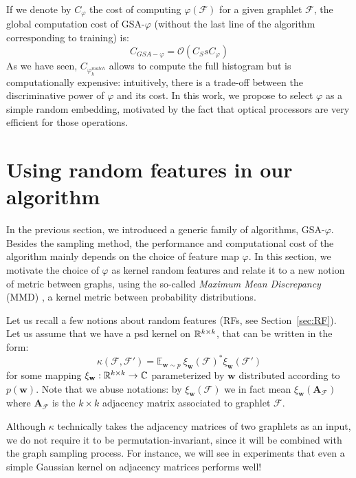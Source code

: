 If we denote by $C_\varphi$ the cost of computing $\varphi(\mathcal{F})$ for a given graphlet $\mathcal{F}$, the global computation cost of GSA-$\varphi$ (without the last line of the algorithm corresponding to training) is:
\begin{equation}
C_{GSA-\varphi} = \mathcal{O}(C_S s C_\varphi)
\end{equation}
As we have seen, $C_{\varphi^{match}_k}$ allows to compute the full histogram but is computationally expensive: intuitively, there is a trade-off between the discriminative power of $\varphi$ and its cost. In this work, we propose to select $\varphi$ as a simple random embedding, motivated by the fact that optical processors are very efficient for those operations. 

\section{Using random features in our algorithm}

In the previous section, we introduced a generic family of algorithms, GSA-$\varphi$. Besides the sampling method, the performance and computational cost of the algorithm mainly depends on the choice of feature map $\varphi$. In this section, we motivate the choice of $\varphi$ as kernel random features  and relate it to a new notion of metric between graphs, using the so-called \emph{Maximum Mean Discrepancy} (MMD) \citep{gretton}, a kernel metric between probability distributions.

Let us recall a few notions about random features (RFs, see Section~\ref{sec:RF}). Let us assume that we have a psd kernel on $\mathbb{R}^{k \times k}$, that can be written in the form:
\begin{equation}
\label{eq:random_features_3}
\kappa(\mathcal{F},\mathcal{F}')= \mathbb{E}_{\mathbf{w} \sim p}~ \xi_\mathbf{w}(\mathcal{F})^* \xi_\mathbf{w}(\mathcal{F}')
\end{equation}
for some mapping $\xi_\mathbf{w} : \mathbb{R}^{k \times k} \to \mathbb{C}$ parameterized by $\mathbf{w}$ distributed according to $p(\mathbf{w})$. Note that we abuse notations: by $\xi_\mathbf{w}(\mathcal{F})$ we in fact mean $\xi_\mathbf{w}(\mathbf{A}_\mathcal{F})$ where $\mathbf{A}_\mathcal{F}$ is the $k\times k$ adjacency matrix associated to graphlet $\mathcal{F}$. 

Although $\kappa$ technically takes the adjacency matrices of two graphlets as an input, we do not require it to be permutation-invariant, since it will be combined with the graph sampling process. For instance, we will see in experiments that even a simple Gaussian kernel on adjacency matrices performs well!

